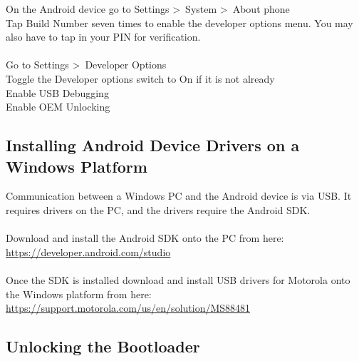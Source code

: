 On the Android device go to Settings \textgreater\ System \textgreater\ About phone\\
\indent Tap Build Number seven times to enable the developer options menu.  You may also have to tap in your PIN for verification.\\
\\
Go to Settings \textgreater\ Developer Options\\
\indent Toggle the Developer options switch to On if it is not already\\
\indent Enable USB Debugging\\
\indent Enable OEM Unlocking

\subsection{Installing Android Device Drivers on a Windows Platform}
\label{sec:Installing Android device drivers on the Windows platform}

Communication between a Windows PC and the Android device is via USB.  It requires drivers on the PC, and the drivers require the Android SDK.\\  
\\
Download and install the Android SDK onto the PC from here:\\
\url{https://developer.android.com/studio}\\
\\
Once the SDK is installed download and install USB drivers for Motorola onto the Windows platform from here:\\
\url{https://support.motorola.com/us/en/solution/MS88481}

\subsection{Unlocking the Bootloader}
\label{sec:Unlocking the Bootloader}


